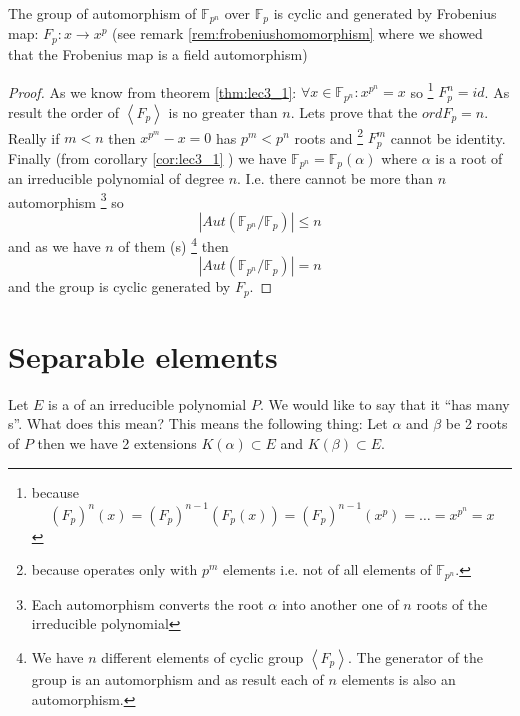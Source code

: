 \begin{corollary}
  The group of automorphism of $\mathbb{F}_{p^n}$ over
  $\mathbb{F}_{p}$ is cyclic and generated by Frobenius map:
  $F_p: x \to x^p$
  (see remark \ref{rem:frobeniushomomorphism} where we showed that the
  Frobenius map is a field automorphism) 
  \label{cor:lec3_2}
  \begin{proof}
    As we know from theorem \ref{thm:lec3_1}:
    $\forall x \in \mathbb{F}_{p^n}: x^{p^n} = x$ so
    \footnote{
      because
      \[
      \left(F_p\right)^n\left(x\right) =
      \left(F_p\right)^{n-1}\left(F_p\left(x\right)\right) =
      \left(F_p\right)^{n-1}\left(x^p\right) = \dots = x^{p^n} = x
      \]
    }
    $F_p^n = id$. As result the order of $\left<F_p\right>$ is no
    greater than $n$. Lets prove that the $ord F_p = n$.
    Really if $m < n$ then
    $x^{p^m} - x =0$ has $p^m < p^n$ roots and
    \footnote{
      because operates only with $p^m$ elements i.e. not of all
      elements of $\mathbb{F}_{p^n}$.
    }
    $F_p^m$ cannot be identity.
    Finally (from corollary \ref{cor:lec3_1} ) we have
    $\mathbb{F}_{p^n} = \mathbb{F}_p\left(\alpha\right)$ where
    $\alpha$ is a root of an irreducible polynomial of degree
    $n$. I.e. there cannot be more than $n$ automorphism
    \footnote{
      Each automorphism converts the root $\alpha$ into another one
      of $n$ roots of the irreducible polynomial
    }
    so 
    \[
    \left|
    Aut\left(
    \mathbb{F}_{p^n}/\mathbb{F}_{p}
    \right)
    \right| \le n
    \]
    and as we have $n$ of them (s)
    \footnote{
      We have $n$ different elements of cyclic group
      $\left<F_p\right>$. The generator of the group is an
      automorphism and as result each of $n$ elements is also an
      automorphism. 
    }
    then
    \[
    \left|
    Aut\left(
    \mathbb{F}_{p^n}/\mathbb{F}_{p}
    \right)
    \right| = n
    \]
    and the group is cyclic generated by $F_p$.
  \end{proof}
\end{corollary}

\section{Separable elements}
\label{sec:lec3_separable_elements}
Let $E$ is a  of an irreducible polynomial
$P$. We would like to say that it ``has many
s''. What does this mean? This means the
following thing:
Let $\alpha$ and $\beta$ be 2 roots of $P$ then we have 2 extensions
$K\left(\alpha\right) \subset E$ and 
$K\left(\beta\right) \subset E$.

